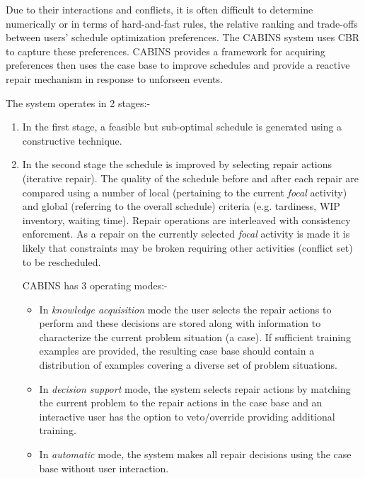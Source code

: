 Due to their interactions and conflicts, it is often difficult to determine numerically or in terms of hard-and-fast rules, the relative ranking and trade-offs between users' schedule optimization preferences. The CABINS system \citep{miyashita95cabins} uses CBR to capture these preferences. CABINS provides a framework for acquiring preferences then uses the case base to improve schedules and provide a reactive repair mechanism in response to unforseen events. 

The system operates in 2 stages:-
\begin{enumerate}
\item In the first stage, a feasible but sub-optimal schedule is generated using a constructive technique. 
\item In the second stage the schedule is improved by selecting repair actions (iterative repair). The quality of the schedule before and after each repair are compared using a number of local (pertaining to the current \emph{focal} activity) and global (referring to the overall schedule) criteria (e.g. tardiness, WIP inventory, waiting time). Repair operations are interleaved with consistency enforcment. As a repair on the currently selected \emph{focal} activity is made it is likely that constraints may be broken requiring other activities (conflict set) to be rescheduled. 

CABINS has 3 operating modes:-
\begin{itemize}
\item In \emph{knowledge acquisition} mode the user selects the repair actions to perform and these decisions are stored along with information to characterize the current problem situation (a case). If sufficient training examples are provided, the resulting case base should contain a distribution of examples covering a diverse set of problem situations.

\item In \emph{decision support} mode, the system selects repair actions by matching the current problem to the repair actions in the case base and an interactive user has the option to veto/override providing additional training.

\item In \emph{automatic} mode, the system makes all repair decisions using the case base without user interaction.
\end{itemize}
\end{enumerate}

